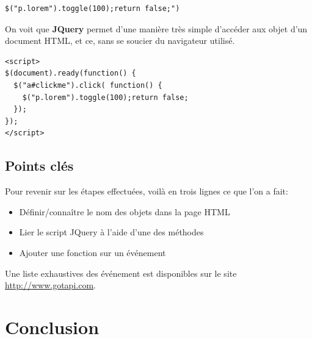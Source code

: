 \documentclass[10pt,a4paper,titlepage]{article}
\begin{document}
\begin{lstlisting}
$("p.lorem").toggle(100);return false;")
\end{lstlisting}

On voit que \textbf{JQuery} permet d'une manière très simple d'accéder aux objet d'un document HTML, et ce, sans se soucier du navigateur utilisé.

\begin{lstlisting}
<script>
$(document).ready(function() {
  $("a#clickme").click( function() {
    $("p.lorem").toggle(100);return false;
  });
});
</script>
\end{lstlisting}

\subsection{Points clés}

Pour revenir sur les étapes effectuées, voilà en trois lignes ce que l'on a fait: \\

\begin{itemize}
	\item Définir/connaître le nom des objets dans la page HTML
	\item Lier le script JQuery à l'aide d'une des méthodes
	\item Ajouter une fonction sur un événement
\end{itemize}

Une liste exhaustives des événement est disponibles sur le site \url{http://www.gotapi.com}.


\newpage

\newpage
\section{Conclusion}

% 
%
% 
% 
\end{document}
